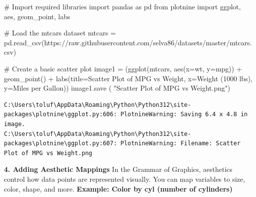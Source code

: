 \documentclass[
  letterpaper,
  DIV=11,
  numbers=noendperiod]{scrreprt}
\newenvironment{Shaded}{\begin{snugshade}}{\end{snugshade}}
\newcommand{\CommentTok}[1]{\textcolor[rgb]{0.37,0.37,0.37}{#1}}
\newcommand{\ImportTok}[1]{\textcolor[rgb]{0.00,0.46,0.62}{#1}}
\newcommand{\NormalTok}[1]{\textcolor[rgb]{0.00,0.23,0.31}{#1}}
\newcommand{\OperatorTok}[1]{\textcolor[rgb]{0.37,0.37,0.37}{#1}}
\newcommand{\StringTok}[1]{\textcolor[rgb]{0.13,0.47,0.30}{#1}}
\begin{document}
\begin{Shaded}
\begin{Highlighting}[]
\CommentTok{\# Import required libraries}
\ImportTok{import}\NormalTok{ pandas }\ImportTok{as}\NormalTok{ pd}
\ImportTok{from}\NormalTok{ plotnine }\ImportTok{import}\NormalTok{ ggplot, aes, geom\_point, labs}

\CommentTok{\# Load the mtcars dataset}
\NormalTok{mtcars }\OperatorTok{=}\NormalTok{ pd.read\_csv(}\StringTok{\textquotesingle{}https://raw.githubusercontent.com/selva86/datasets/master/mtcars.csv\textquotesingle{}}\NormalTok{)}

\CommentTok{\# Create a basic scatter plot}
\NormalTok{image1 }\OperatorTok{=}\NormalTok{ (ggplot(mtcars, aes(x}\OperatorTok{=}\StringTok{\textquotesingle{}wt\textquotesingle{}}\NormalTok{, y}\OperatorTok{=}\StringTok{\textquotesingle{}mpg\textquotesingle{}}\NormalTok{)) }\OperatorTok{+}
\NormalTok{ geom\_point() }\OperatorTok{+}
\NormalTok{ labs(title}\OperatorTok{=}\StringTok{\textquotesingle{}Scatter Plot of MPG vs Weight\textquotesingle{}}\NormalTok{,}
\NormalTok{      x}\OperatorTok{=}\StringTok{\textquotesingle{}Weight (1000 lbs)\textquotesingle{}}\NormalTok{,}
\NormalTok{      y}\OperatorTok{=}\StringTok{\textquotesingle{}Miles per Gallon\textquotesingle{}}\NormalTok{))}
\NormalTok{image1.save ( }\StringTok{"Scatter Plot of MPG vs Weight.png"}\NormalTok{)}
\end{Highlighting}
\end{Shaded}

\begin{verbatim}
C:\Users\toluf\AppData\Roaming\Python\Python312\site-packages\plotnine\ggplot.py:606: PlotnineWarning: Saving 6.4 x 4.8 in image.
C:\Users\toluf\AppData\Roaming\Python\Python312\site-packages\plotnine\ggplot.py:607: PlotnineWarning: Filename: Scatter Plot of MPG vs Weight.png
\end{verbatim}

\textbf{4. Adding Aesthetic Mappings} In the Grammar of Graphics,
aesthetics control how data points are represented visually. You can map
variables to size, color, shape, and more. \textbf{Example: Color by cyl
(number of cylinders)}
\end{document}
